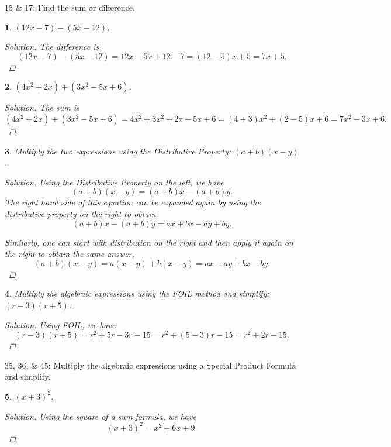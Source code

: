 \documentclass[12pt]{amsart}
\newtheorem{thm}{}
\begin{document}
15 \& 17: Find the sum or difference.
\setcounter{thm}{14}
\begin{thm}
  $(12x - 7) - (5x - 12)$.
  \begin{proof}[Solution]
    The difference is
    $$(12x - 7) - (5x - 12) = 12x - 5x + 12 - 7 = (12 - 5)x + 5 = 7x + 5.$$
  \end{proof}
\end{thm}

\setcounter{thm}{16}
\begin{thm}
  $(4x^2 + 2x) + (3x^2 - 5x + 6)$.
  \begin{proof}[Solution]
    The sum is
    $$(4x^2 + 2x) + (3x^2 - 5x + 6) = 4x^2 + 3x^2 + 2x - 5x + 6 = (4 + 3)x^2 + (2 - 5)x + 6 = 7x^2 - 3x + 6.$$
  \end{proof}
\end{thm}

\setcounter{thm}{23}
\begin{thm}
  Multiply the two expressions using the Distributive Property: $(a + b)(x - y)$.
  
  \begin{proof}[Solution]
    Using the Distributive Property on the left, we have
    $$(a + b)(x - y) = (a + b)x - (a + b)y.$$
    The right hand side of this equation can be expanded again by using the distributive property on the right to obtain
    $$(a + b)x - (a + b)y = ax + bx - ay + by.$$
    
    Similarly, one can start with distribution on the right and then apply it again on the right to obtain the same answer,
    $$(a + b)(x - y) = a(x - y) + b(x - y) = ax - ay + bx - by.$$
  \end{proof}
\end{thm}

\setcounter{thm}{28}
\begin{thm}
  Multiply the algebraic expressions using the FOIL method and simplify: $(r - 3)(r + 5)$.
  
  \begin{proof}[Solution]
    Using FOIL, we have
    $$(r - 3)(r + 5) = r^2 + 5r - 3r - 15 = r^2 + (5 - 3)r - 15 = r^2 + 2r - 15.$$
  \end{proof}
\end{thm}

35, 36, \& 45: Multiply the algebraic expressions using a Special Product Formula and simplify.
\setcounter{thm}{34}
\begin{thm}
  $(x + 3)^2$.
  
  \begin{proof}[Solution]
    Using the square of a sum formula, we have 
    $$(x + 3)^2 = x^2 + 6x + 9.$$
  \end{proof}
\end{thm}
\end{document}
